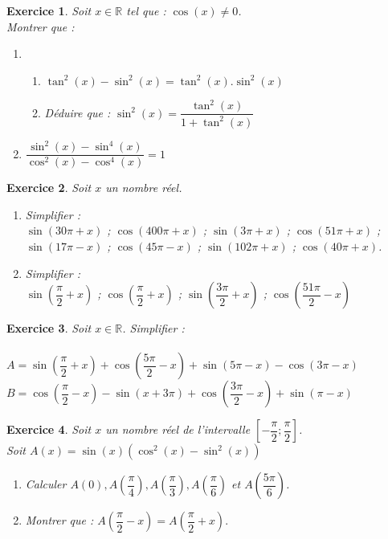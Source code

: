 \documentclass[12pt,a4paper]{article}
\newcommand{\R}{\mathbb{R}}
\newcommand{\s}{\sin}
\newcommand{\cs}{\cos}
\theoremstyle{mystyle}
\newtheorem{exo}{Exercice}
\begin{document}
\begin{multicols*}{2}
\begin{exo}
Soit $x\in\R$ tel que : $\cos(x)\neq 0$.\\Montrer que :
\begin{enumerate}
	\item 
		\begin{enumerate}
			\item $\tan^2(x) - \sin^2(x) = \tan^2(x).\sin^2(x)$
			\item Déduire que : $\sin^2(x) = \dfrac{\tan^2(x)}{1 + \tan^2(x)}$
		\end{enumerate}
	\item $\dfrac{\s^2(x) - \s^4(x)}{\cs^2(x) - \cs^4(x)} = 1$
\end{enumerate}
\end{exo}
\newpage
\begin{exo}
Soit $x$ un nombre réel.
\begin{enumerate}
	\item Simplifier : \\$\s(30\pi + x)$ ; $\cs(400\pi + x)$ ; $\s(3\pi + x)$ ; $\cs(51\pi + x)$ ; $\s(17\pi - x)$ ; $\cs(45\pi - x)$ ; $\s(102\pi + x)$ ; $\cs(40\pi + x)$.
	\item Simplifier : \\$\s\left(\dfrac{\pi}{2} + x\right)$ ; $\cs\left(\dfrac{\pi}{2} + x\right)$ ; $\s\left(\dfrac{3\pi}{2} + x\right)$ ; $\cs\left(\dfrac{51\pi}{2} - x\right)$
\end{enumerate}
\end{exo}

\begin{exo}
Soit $x\in\R$. Simplifier :\\ \\
	 $A = \s\left(\dfrac{\pi}{2} + x\right) + \cs\left(\dfrac{5\pi}{2} - x\right) + \s(5\pi - x) - \cs(3\pi - x)$
	 $B = \cs\left(\dfrac{\pi}{2} - x\right) - \s(x + 3\pi) + \cs\left(\dfrac{3\pi}{2} - x\right) + \s(\pi - x)$
\end{exo}

\begin{exo}
Soit $x$ un nombre réel de l'intervalle $\left[-\dfrac{\pi}{2};\dfrac{\pi}{2}\right]$.\\
Soit $A(x) = \s(x)(\cs^2(x) - \s^2(x))$
\begin{enumerate}
	\item Calculer $A(0), A\left(\dfrac{\pi}{4}\right),A\left(\dfrac{\pi}{3}\right), A\left(\dfrac{\pi}{6}\right)$ et $A\left(\dfrac{5\pi}{6}\right)$.
	\item Montrer que : $A\left(\dfrac{\pi}{2} - x\right) = A\left(\dfrac{\pi}{2} + x\right).$
\end{enumerate}
\end{exo}


\end{multicols*}
\end{document}
